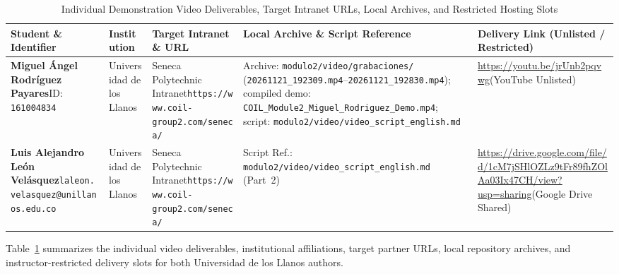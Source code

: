 \begin{table}[t]
\centering
\caption{Individual Demonstration Video Deliverables, Target Intranet URLs, Local Archives, and Restricted Hosting Slots}
\label{tab:demo_videos}
\footnotesize
\setlength{\tabcolsep}{4pt}
\renewcommand{\arraystretch}{1.25}
\begin{tabularx}{\textwidth}{
  >{\raggedright\arraybackslash}p{3.45cm}
  >{\raggedright\arraybackslash}p{2.05cm}
  >{\raggedright\arraybackslash}p{3.65cm}
  >{\raggedright\arraybackslash}X
  >{\raggedright\arraybackslash}p{3.15cm}
}
\toprule
\textbf{Student \& Identifier} & \textbf{Institution} & \textbf{Target Intranet \& URL} & \textbf{Local Archive \& Script Reference} & \textbf{Delivery Link (Unlisted / Restricted)} \\
\midrule
\textbf{Miguel \'{A}ngel Rodr\'{i}guez Payares}\newline ID: \texttt{161004834} & Universidad de los Llanos & Seneca Polytechnic Intranet\newline \texttt{https://\allowbreak www.coil-group2.com/\allowbreak seneca/} & Archive: \texttt{modulo2/\allowbreak video/\allowbreak grabaciones/} (\texttt{20261121\_192309.mp4}--\texttt{20261121\_192830.mp4}); compiled demo: \texttt{COIL\_Module2\_\allowbreak Miguel\_Rodriguez\_\allowbreak Demo.mp4}; script: \texttt{modulo2/\allowbreak video/\allowbreak video\_script\_\allowbreak english.md} & \url{https://youtu.be/jrUnb2pqvwg}\newline (YouTube Unlisted) \\
\addlinespace[4pt]
\textbf{Luis Alejandro Le\'{o}n Vel\'{a}squez}\newline \texttt{laleon.velasquez@\allowbreak unillanos.edu.co} & Universidad de los Llanos & Seneca Polytechnic Intranet\newline \texttt{https://\allowbreak www.coil-group2.com/\allowbreak seneca/} & Script Ref.: \texttt{modulo2/\allowbreak video/\allowbreak video\_script\_\allowbreak english.md} (Part~2) & \url{https://drive.google.com/file/d/1cM7jSHlOZLz9tFr89fhZOlAa03Ix47CH/view?usp=sharing}\newline (Google Drive Shared) \\
\bottomrule
\end{tabularx}
\end{table}

Table~\ref{tab:demo_videos} summarizes the individual video deliverables, institutional affiliations, target partner URLs, local repository archives, and instructor-restricted delivery slots for both Universidad de los Llanos authors.


